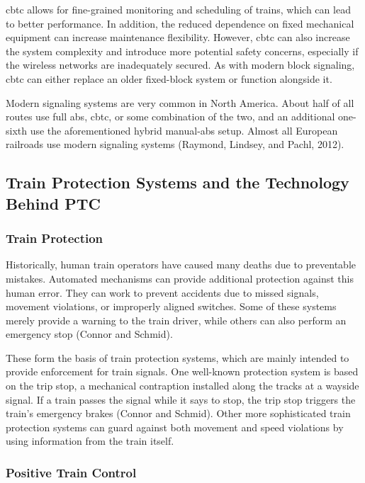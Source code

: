\documentclass[11pt, titlepage]{article}
\begin{document}
\gls{cbtc} allows for fine-grained monitoring and scheduling of trains, which can
lead to better performance. In addition, the reduced dependence on fixed mechanical
equipment can increase maintenance flexibility. However, \gls{cbtc} can also
increase the system complexity and introduce more potential safety concerns,
especially if the wireless networks are inadequately secured. As with modern block
signaling, \gls{cbtc} can either replace an older fixed-block system or function
alongside it.

Modern signaling systems are very common in North America. About half of all routes
use full \gls{abs}, \gls{cbtc}, or some combination of the two, and an additional
one-sixth use the aforementioned hybrid manual-\gls{abs} setup. Almost all European
railroads use modern signaling systems (Raymond, Lindsey, and Pachl, 2012).

\subsection{Train Protection Systems and the Technology Behind PTC}

\subsubsection{Train Protection}

Historically, human train operators have caused many deaths due to preventable
mistakes. Automated mechanisms can provide additional protection against this human
error. They can work to prevent accidents due to missed signals, movement
violations, or improperly aligned switches. Some of these systems merely provide a
warning to the train driver, while others can also perform an emergency stop
(Connor and Schmid).

These form the basis of train protection systems, which are mainly intended to
provide enforcement for train signals. One well-known protection system is based on
the trip stop, a mechanical contraption installed along the tracks at a wayside
signal. If a train passes the signal while it says to stop, the trip stop triggers
the train’s emergency brakes (Connor and Schmid). Other more sophisticated
train protection systems can guard against both movement and speed violations by
using information from the train itself.

\subsubsection{Positive Train Control}
\end{document}
